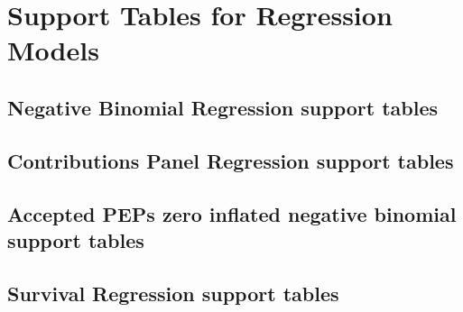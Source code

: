 \chapter{Support Tables for Regression Models}
\label{support-tables}

\section{Negative Binomial Regression support tables}





\section{Contributions Panel Regression support tables}





\section{Accepted PEPs zero inflated negative binomial support tables}





\section{Survival Regression support tables}





